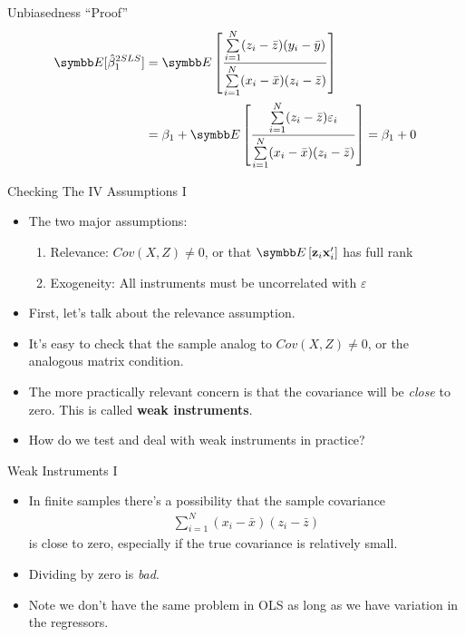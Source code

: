 \documentclass[aspectratio=169,11pt]{beamer}
\begin{document}
\begin{frame}{Unbiasedness ``Proof''}
\begin{align*}
\E[\hat{\beta}_1^{2SLS}]&=\E\left[\frac{\sum\limits_{i=1}^N(z_i-\bar{z})(y_i-\bar{y})}{\sum\limits_{i=1}^N(x_i-\bar{x})(z_i-\bar{z})} \right] \\
&=\beta_1 + \E\left[ \frac{\sum\limits_{i=1}^N(z_i-\bar{z})\varepsilon_i}{\sum\limits_{i=1}^N(x_i-\bar{x})(z_i-\bar{z})} \right] =\beta_1 + 0
\end{align*}
\end{frame}



\begin{frame}{Checking The IV Assumptions I}
\begin{itemize}
\item The two major assumptions:
\begin{enumerate}
	\item Relevance: $Cov(X,Z)\ne 0$, or that $\E\left[{\bf z}_i {\bf x}_i' \right]$ has full rank

	\item Exogeneity: All instruments must be uncorrelated with $\varepsilon$
\end{enumerate}
\smallskip
\item First, let's talk about the relevance assumption.
	\item It's easy to check that the sample analog to $Cov(X,Z)\ne 0$, or the analogous
	matrix condition.
	 \item The more practically relevant concern is that the covariance will be \emph{close}
	 to zero. This is called {\bf weak instruments}.
	 \item How do we test and deal with weak instruments in practice?

\end{itemize}
\end{frame}


\begin{frame}{Weak Instruments I}
\begin{itemize}
	\item In finite samples there's a possibility that the sample covariance
	\begin{align*}
	\sum\limits_{i=1}^N(x_i-\bar{x})(z_i-\bar{z})
	\end{align*}
	is close to zero, especially if the true covariance is relatively small.
	\medskip
	\item Dividing by zero is \emph{bad}.
	\medskip
	\item Note we don't have the same problem in OLS as long as we have variation in the regressors.

\end{itemize}
\end{frame}
\end{document}
